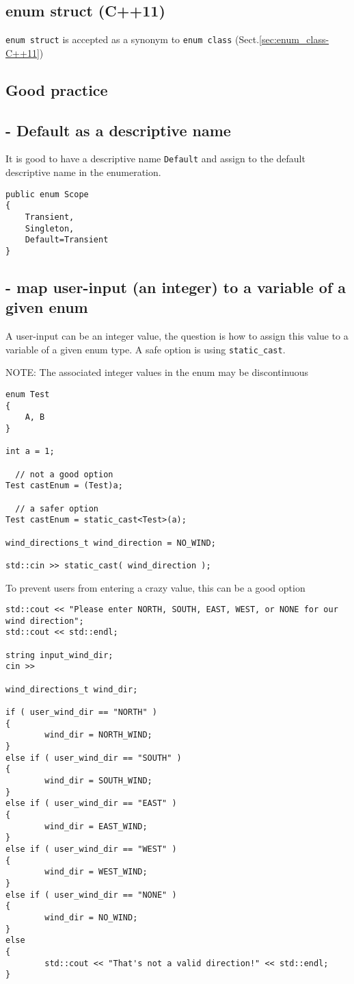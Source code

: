 \subsection{enum struct (C++11)}
\label{sec:enum_struct-C++11}

\verb!enum struct! is accepted as a synonym to \verb!enum class!
(Sect.\ref{sec:enum_class-C++11})

\subsection{Good practice}

\subsection{- Default as a descriptive name}

It is good to have a descriptive name \verb!Default! and assign to the default
descriptive name in the enumeration.
\begin{verbatim}
public enum Scope
{
    Transient,
    Singleton,
    Default=Transient
}
\end{verbatim}

\subsection{- map user-input (an integer) to a variable of a given enum}

A user-input can be an integer value, the question is how to assign this value 
to a variable of a given enum type. A safe option is using \verb!static_cast!.

NOTE: The associated integer values in the enum may be discontinuous

\begin{lstlisting}
enum Test
{
    A, B
}

int a = 1;

  // not a good option
Test castEnum = (Test)a;

  // a safer option
Test castEnum = static_cast<Test>(a);

wind_directions_t wind_direction = NO_WIND;

std::cin >> static_cast( wind_direction );

\end{lstlisting}


To prevent users from entering a crazy value, this can be a good option
{\small 
\begin{verbatim}
std::cout << "Please enter NORTH, SOUTH, EAST, WEST, or NONE for our wind direction";
std::cout << std::endl;

string input_wind_dir;
cin >>

wind_directions_t wind_dir;

if ( user_wind_dir == "NORTH" )
{
        wind_dir = NORTH_WIND;
}
else if ( user_wind_dir == "SOUTH" )
{
        wind_dir = SOUTH_WIND;
}
else if ( user_wind_dir == "EAST" )
{
        wind_dir = EAST_WIND;
}
else if ( user_wind_dir == "WEST" )
{
        wind_dir = WEST_WIND;
}
else if ( user_wind_dir == "NONE" )
{
        wind_dir = NO_WIND;
}
else
{
        std::cout << "That's not a valid direction!" << std::endl;
}
\end{verbatim}
}


